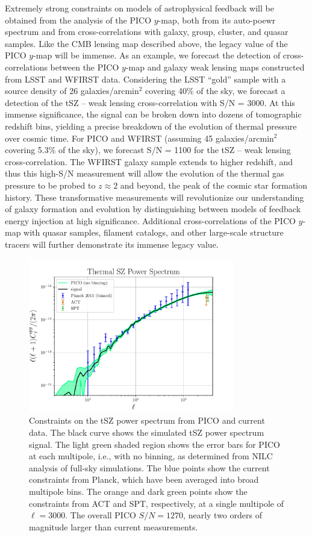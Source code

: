 \documentclass[PICOReport.tex]{subfiles}
\begin{document}
Extremely strong constraints on models of astrophysical feedback will be obtained from the analysis of the PICO $y$-map, both from its auto-poewr spectrum and from cross-correlations with galaxy, group, cluster, and quasar samples.  Like the CMB lensing map described above, the legacy value of the PICO $y$-map will be immense.  As an example, we forecast the detection of cross-correlations between the PICO $y$-map and galaxy weak lensing maps constructed from LSST and WFIRST data.  Considering the LSST ``gold'' sample with a source density of 26 galaxies/arcmin${}^2$ covering 40\% of the sky, we forecast a detection of the tSZ -- weak lensing cross-correlation with S/N = 3000.  At this immense significance, the signal can be broken down into dozens of tomographic redshift bins, yielding a precise breakdown of the evolution of thermal pressure over cosmic time.  For PICO and WFIRST (assuming 45 galaxies/arcmin${}^2$ covering 5.3\% of the sky), we forecast S/N = 1100 for the tSZ -- weak lensing cross-correlation.  The WFIRST galaxy sample extends to higher redshift, and thus this high-S/N measurement will allow the evolution of the thermal gas pressure to be probed to $z \approx 2$ and beyond, the peak of the cosmic star formation history.  These transformative measurements will revolutionize our understanding of galaxy formation and evolution by distinguishing between models of feedback energy injection at high significance.  Additional cross-correlations of the PICO $y$-map with quasar samples, filament catalogs, and other large-scale structure tracers will further demonstrate its immense legacy value.

\begin{figure}
\begin{center}
\includegraphics[width=0.8\textwidth]{images/PICO_tSZ_PS_plot.pdf}
\end{center}
\caption{\label{fig:PICO_tSZ_PS} Constraints on the tSZ power spectrum from PICO and current data.  The black curve shows the simulated tSZ power spectrum signal.  The light green shaded region shows the error bars for PICO at each multipole, i.e., with no binning, as determined from NILC analysis of full-sky simulations.  The blue points show the current constraints from Planck, which have been averaged into broad multipole bins.  The orange and dark green points show the constraints from ACT and SPT, respectively, at a single multipole of $\ell=3000$.  The overall PICO $S/N = 1270$, nearly two orders of magnitude larger than current measurements.}
\end{figure}
\end{document}
